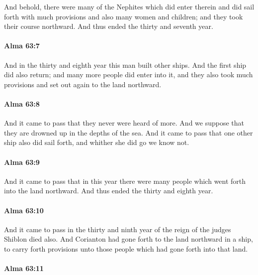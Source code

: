 			And behold, there were many of the Nephites which did enter therein
			and did sail forth with much provisions
			and also many women and children;
			and they took their course northward.
			And thus ended the thirty and seventh year.

		\paragraph{Alma 63:7} %
			\label{ALMA-63-7}

			And in the thirty and eighth year this man built other ships.
			And the first ship did also return;
			and many more people did enter into it,
			and they also took much provisions
			and set out again to the land northward.

		\paragraph{Alma 63:8} %
			\label{ALMA-63-8}

			And it came to pass that they never were heard of more.
			And we suppose that they are drowned up in the depths of the sea.
			And it came to pass that one other ship also did sail forth,
			and whither she did go we know not.

		\paragraph{Alma 63:9} %
			\label{ALMA-63-9}

			And it came to pass that in this year
			there were many people which went forth into the land northward.
			And thus ended the thirty and eighth year.

		\paragraph{Alma 63:10} %
			\label{ALMA-63-10}

			And it came to pass
			in the thirty and ninth year of the reign of the judges
			Shiblon died also.
			And Corianton had gone forth to the land northward in a ship,
			to carry forth provisions unto those people which had gone forth into that land.

		\paragraph{Alma 63:11} %
			\label{ALMA-63-11}

